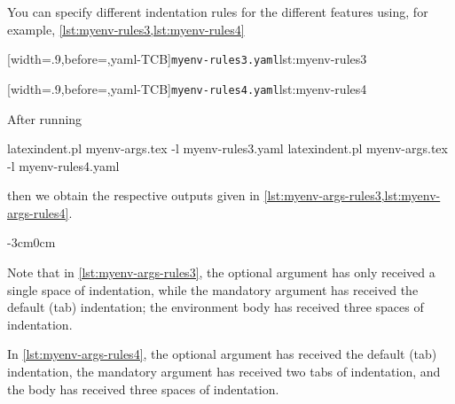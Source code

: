 \documentclass[10pt]{article}
\newenvironment{widepage}{\begin{adjustwidth}{-3cm}{0cm}}{\end{adjustwidth}}
\begin{document}
 \begin{example}
 You can specify different indentation rules for the different features using, for
 example, \cref{lst:myenv-rules3,lst:myenv-rules4}

 \begin{minipage}{.49\textwidth}
  [width=.9\linewidth,before=\centering,yaml-TCB]{\texttt{myenv-rules3.yaml}}{lst:myenv-rules3}
 \end{minipage}
 \hfill
 \begin{minipage}{.49\textwidth}
  [width=.9\linewidth,before=\centering,yaml-TCB]{\texttt{myenv-rules4.yaml}}{lst:myenv-rules4}
 \end{minipage}

 After running 

 \begin{commandshell}
latexindent.pl myenv-args.tex -l myenv-rules3.yaml  
latexindent.pl myenv-args.tex -l myenv-rules4.yaml  
\end{commandshell}

 then we obtain the respective outputs given in
 \cref{lst:myenv-args-rules3,lst:myenv-args-rules4}.

 \begin{widepage}
  \begin{minipage}{.5\textwidth}
  \end{minipage}%
  \hfill
  \begin{minipage}{.5\textwidth}
  \end{minipage}
 \end{widepage}

 Note that in \cref{lst:myenv-args-rules3}, the optional argument has only received a
 single space of indentation, while the mandatory argument has received the default (tab)
 indentation; the environment body has received three spaces of indentation.

 In \cref{lst:myenv-args-rules4}, the optional argument has received the default (tab)
 indentation, the mandatory argument has received two tabs of indentation, and the body
 has received three spaces of indentation.
 \end{example}
\end{document}
